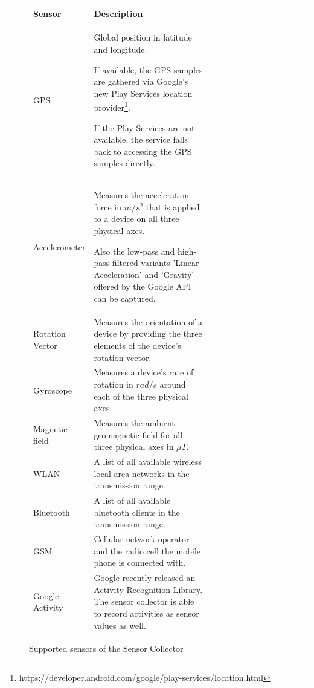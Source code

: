 \begin{figure}
\centering
\begin{tabular}{|l|p{0.7\linewidth}|}
  \hline
  Sensor & Description \\
  \hline
  GPS                 & Global position in latitude and longitude. 

                        If available, the GPS samples are gathered via
                        Google's new Play Services location
                        provider\footnote{https://developer.android.com/google/play-services/location.html}.
                        
                        If the Play Services are not available, the service falls back to
                        accessing the GPS samples directly.
  \\ \hline
  Accelerometer       & Measures the acceleration force in $m/s^2$
                        that is applied to a device on all three
                        physical axes. 

                        Also the low-pass and high-pass filtered
                        variants 'Linear Acceleration' and 'Gravity' offered by the Google
                        API can be captured.
  \\ 
  Rotation Vector     & Measures the orientation of a device by
                        providing the three elements of the device's
                        rotation vector.  
  \\
  Gyroscope           & Measures a device's rate of rotation in
                        $rad/s$ around each of the three physical
                        axes. 
  \\ 
  Magnetic field      & Measures the ambient geomagnetic field for all
                        three physical axes in $\mu T$. 
  \\ \hline
  WLAN                & A list of all available wireless local area
                        networks in the transmission range. 
  \\
  Bluetooth           & A list of all available bluetooth clients in
                        the transmission range. 
  \\
  GSM                 & Cellular network operator and the radio cell
                        the mobile phone is connected with. 
  \\ \hline
  Google Activity     & Google recently released an Activity
                        Recognition Library. The sensor collector is able to record activities as sensor
                        values as well. 
  \\
  \hline
\end{tabular}
\caption{Supported sensors of the Sensor Collector}
\label{fig:sensor_table}
\end{figure}

